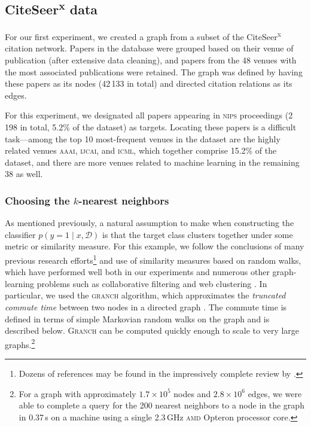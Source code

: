 \documentclass{article}
\newcommand{\cm}[1]{\mathcal{#1}}
\newcommand{\data}{\cm{D}}
\newcommand{\given}{\mid}
\begin{document}
\subsection{CiteSeer\textsuperscript{\textbf{x}} data}

For our first experiment, we created a graph from a subset of the
CiteSeer\textsuperscript{x}\,citation network.  Papers in the database
were grouped based on their venue of publication (after extensive data
cleaning), and papers from the 48 venues with the most associated
publications were retained.  The graph was defined by having these
papers as its nodes (42\,133 in total) and directed citation
relations as its edges.

For this experiment, we designated all papers appearing in
\textsc{nips} proceedings (2\,198 in total, 5.2\% of the dataset) as
targets.  Locating these papers is a difficult task---among the top 10
most-frequent venues in the dataset are the highly related venues
\textsc{aaai}, \textsc{ijcai}, and \textsc{icml}, which together
comprise 15.2\% of the dataset, and there are more venues related to
machine learning in the remaining 38 as well.

\subsubsection{Choosing the $k$-nearest neighbors}

As mentioned previously, a natural assumption to make when
constructing the classifier $p(y = 1 \given x, \data)$ is that the
target class clusters together under some metric or similarity
measure.  For this example, we follow the conclusions of many previous
research efforts\footnote{Dozens of references may be found in the
  impressively complete review by \citet{fousssigmoid}.} and use of
similarity measures based on random walks, which have performed well
both in our experiments and numerous other graph-learning problems
such as collaborative filtering and web clustering
\citep{fousssigmoid}.  In particular, we used the \textsc{granch}
algorithm, which approximates the \emph{truncated commute time}
between two nodes in a directed graph \citep{granch}.  The commute
time is defined in terms of simple Markovian random walks on the graph
and is described below.  \textsc{Granch} can be computed
quickly enough to scale to very large graphs.\footnote{For a graph
  with approximately $1.7 \times 10^5$ nodes and $2.8 \times 10^6$
  edges, we were able to complete a query for the 200 nearest
  neighbors to a node in the graph in 0.37\,s on a machine using a
  single 2.3\,GHz \textsc{amd} Opteron processor core.}
\end{document}

